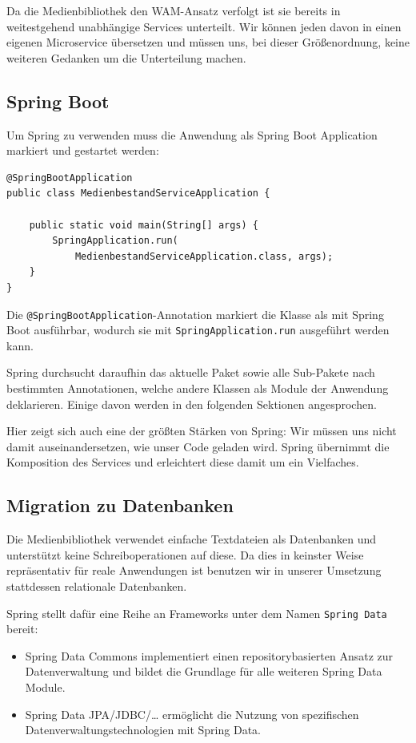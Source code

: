 \documentclass{article}
\begin{document}
Da die Medienbibliothek den WAM-Ansatz verfolgt ist sie bereits in weitestgehend unabhängige Services unterteilt.
Wir können jeden davon in einen eigenen Microservice übersetzen und müssen uns, bei dieser Größenordnung, keine weiteren Gedanken um die Unterteilung machen.

\subsection{Spring Boot}

Um Spring zu verwenden muss die Anwendung als Spring Boot Application markiert und gestartet werden:

\begin{lstlisting}
@SpringBootApplication
public class MedienbestandServiceApplication {

    public static void main(String[] args) {
        SpringApplication.run(
        	MedienbestandServiceApplication.class, args);
    }
}
\end{lstlisting}

Die \texttt{@SpringBootApplication}-Annotation markiert die Klasse als mit Spring Boot ausführbar, wodurch sie mit \texttt{SpringApplication.run} ausgeführt werden kann.

Spring durchsucht daraufhin das aktuelle Paket sowie alle Sub-Pakete nach bestimmten Annotationen, welche andere Klassen als Module der Anwendung deklarieren.
Einige davon werden in den folgenden Sektionen angesprochen.

Hier zeigt sich auch eine der größten Stärken von Spring: Wir müssen uns nicht damit auseinandersetzen, wie unser Code geladen wird.
Spring übernimmt die Komposition des Services und erleichtert diese damit um ein Vielfaches.

\subsection{Migration zu Datenbanken}

Die Medienbibliothek verwendet einfache Textdateien als Datenbanken und unterstützt keine Schreiboperationen auf diese.
Da dies in keinster Weise repräsentativ für reale Anwendungen ist benutzen wir in unserer Umsetzung stattdessen relationale Datenbanken.

Spring stellt dafür eine Reihe an Frameworks unter dem Namen \texttt{Spring Data} bereit:
\begin{itemize}
        \item{Spring Data Commons} {implementiert einen repositorybasierten Ansatz zur Datenverwaltung und bildet die Grundlage für alle weiteren Spring Data Module.}
        \item{Spring Data JPA/JDBC/\ldots} ermöglicht die Nutzung von spezifischen Datenverwaltungstechnologien mit Spring Data.
\end{itemize}
\end{document}
